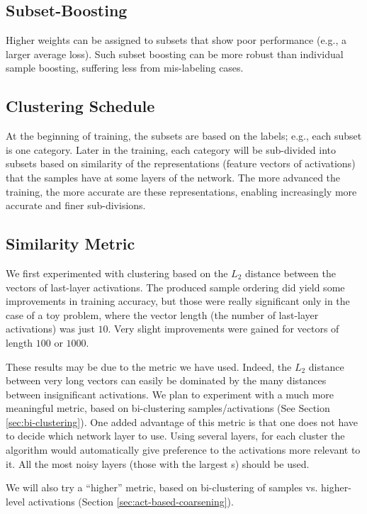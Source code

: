 \documentclass{article} %
\begin{document}
\subsection{Subset-Boosting}
Higher weights can be assigned to subsets that show poor performance (e.g., a larger average loss). Such subset boosting can be more robust than individual sample boosting, suffering less from mis-labeling cases. 

\subsection{Clustering Schedule}
At the beginning of training, the subsets are based on the labels; e.g., each subset is one category. Later in the training, each category will be sub-divided into subsets based on similarity of the representations (feature vectors of activations) that the samples have at some layers of the network. The more advanced the training, the more accurate are these representations, enabling increasingly more accurate and finer sub-divisions.

\subsection{Similarity Metric}
We first experimented with clustering based on the $L_2$ distance between the vectors of last-layer activations. The produced sample ordering did yield some improvements in training accuracy, but those were really significant only in the case of a toy problem, where the vector length (the number of last-layer activations) was just $10$. Very slight improvements were gained for vectors of length $100$ or $1000$. 

These results may be due to the metric we have used. Indeed, the $L_2$ distance between very long vectors can easily be dominated by the many distances between insignificant activations. We plan to experiment with a much more meaningful metric, based on bi-clustering samples/activations (See Section \ref{sec:bi-clustering}). One added advantage of this metric is that one does not have to decide which network layer to use. Using several layers, for each cluster the algorithm would automatically give preference to the activations more relevant to it. All the most noisy layers (those with the largest {\NAL}s) should be used. 

We will also try a ``higher'' metric, based on bi-clustering of samples vs. higher-level activations (Section \ref{sec:act-based-coarsening}).
\end{document}
